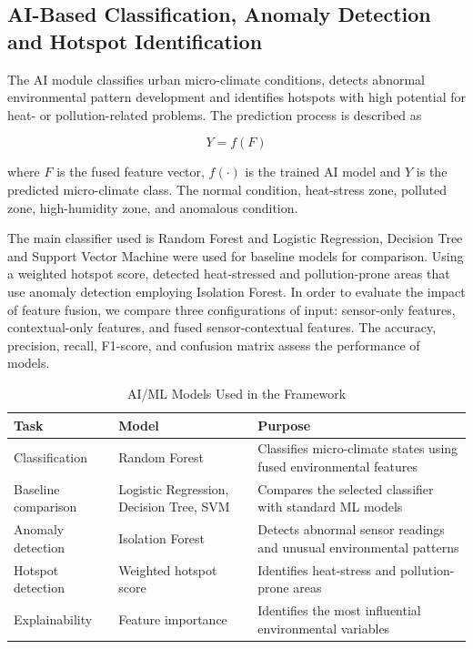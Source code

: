 \documentclass[conference]{IEEEtran}
\begin{document}
\subsection{AI-Based Classification, Anomaly Detection and Hotspot Identification}

The AI module classifies urban micro-climate conditions, detects abnormal environmental pattern development and identifies hotspots with high potential for heat- or pollution-related problems. The prediction process is described as

\begin{equation}
Y = f(F)
\end{equation}

where $F$ is the fused feature vector, $f(\cdot)$ is the trained AI model and $Y$ is the predicted micro-climate class. The normal condition, heat-stress zone, polluted zone, high-humidity zone, and anomalous condition.

The main classifier used is Random Forest and Logistic Regression, Decision Tree and Support Vector Machine were used for baseline models for comparison. Using a weighted hotspot score, detected heat-stressed and pollution-prone areas that use anomaly detection employing Isolation Forest.  In order to evaluate the impact of feature fusion, we compare three configurations of input: sensor-only features, contextual-only features, and fused sensor-contextual features. The accuracy, precision, recall, F1-score, and confusion matrix assess the performance of models. 

\begin{table}[!t]
\caption{AI/ML Models Used in the Framework}
\centering
\footnotesize
\begin{tabular}{p{2.1cm} p{2.1cm} p{3.0cm}}
\hline
\textbf{Task} & \textbf{Model} & \textbf{Purpose} \\
\hline
Classification & Random Forest & Classifies micro-climate states using fused environmental features \\
Baseline comparison & Logistic Regression, Decision Tree, SVM & Compares the selected classifier with standard ML models \\
Anomaly detection & Isolation Forest & Detects abnormal sensor readings and unusual environmental patterns \\
Hotspot detection & Weighted hotspot score & Identifies heat-stress and pollution-prone areas \\
Explainability & Feature importance & Identifies the most influential environmental variables \\
\hline
\end{tabular}
\label{tab:ai_models}
\end{table}
\end{document}

